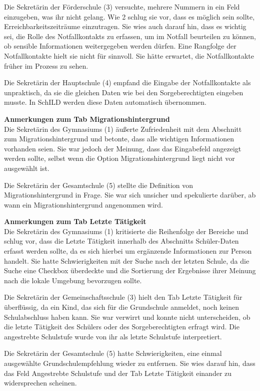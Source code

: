 Die Sekretärin der Förderschule (3) versuchte, mehrere Nummern in ein Feld einzugeben, was ihr nicht gelang. Wie 2 schlug sie vor, dass es möglich sein sollte, Erreichbarkeitszeiträume einzutragen. Sie wies auch darauf hin, dass es wichtig sei, die Rolle des Notfallkontakts zu erfassen, um im Notfall beurteilen zu können, ob sensible Informationen weitergegeben werden dürfen. Eine Rangfolge der Notfallkontakte hielt sie nicht für sinnvoll. Sie hätte erwartet, die Notfallkontakte früher im Prozess zu sehen.

Die Sekretärin der Hauptschule (4) empfand die Eingabe der Notfallkontakte als unpraktisch, da sie die gleichen Daten wie bei den Sorgeberechtigten eingeben musste. In SchILD werden diese Daten automatisch übernommen.

\textbf{Anmerkungen zum Tab \glqq Migrationshintergrund\grqq{}}\\
Die Sekretärin des Gymnasiums (1) äußerte Zufriedenheit mit dem Abschnitt zum Migrationshintergrund und betonte, dass alle wichtigen Informationen vorhanden seien. Sie war jedoch der Meinung, dass das Eingabefeld angezeigt werden sollte, selbst wenn die Option \glqq Migrationshintergrund liegt nicht vor\grqq{} ausgewählt ist.

Die Sekretärin der Gesamtschule (5) stellte die Definition von \glqq Migrationshintergrund\grqq{} in Frage. Sie war sich unsicher und spekulierte darüber, ab wann ein Migrationshintergrund angenommen wird.

\textbf{Anmerkungen zum Tab \glqq Letzte Tätigkeit\grqq{}}\\
Die Sekretärin des Gymnasiums (1) kritisierte die Reihenfolge der Bereiche und schlug vor, dass die \glqq Letzte Tätigkeit\grqq{} innerhalb des Abschnitts \glqq Schüler-Daten\grqq{} erfasst werden sollte, da es sich hierbei um ergänzende Informationen zur Person handelt. Sie hatte Schwierigkeiten mit der Suche nach der letzten Schule, da die Suche eine Checkbox überdeckte und die Sortierung der Ergebnisse ihrer Meinung nach die lokale Umgebung bevorzugen sollte.

Die Sekretärin der Gemeinschaftsschule (3) hielt den Tab \glqq Letzte Tätigkeit\grqq{} für überflüssig, da ein Kind, das sich für die Grundschule anmeldet, noch keinen Schulabschluss haben kann. Sie war verwirrt und konnte nicht unterscheiden, ob die letzte Tätigkeit des Schülers oder des Sorgeberechtigten erfragt wird. Die angestrebte Schulstufe wurde von ihr als letzte Schulstufe interpretiert.

Die Sekretärin der Gesamtschule (5) hatte Schwierigkeiten, eine einmal ausgewählte Grundschulempfehlung wieder zu entfernen. Sie wies darauf hin, dass das Feld \glqq Angestrebte Schulstufe\grqq{} und der Tab \glqq Letzte Tätigkeit\grqq{} einander zu widersprechen scheinen.


